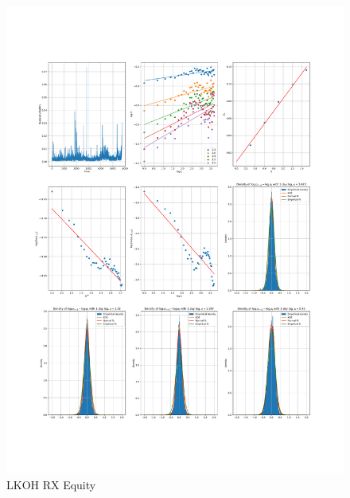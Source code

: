     \begin{figure}[h]
        \includegraphics[width=\textwidth]{fig/LKOH RX Equity.pdf}
        \caption{LKOH RX Equity}
    \end{figure} 
        

